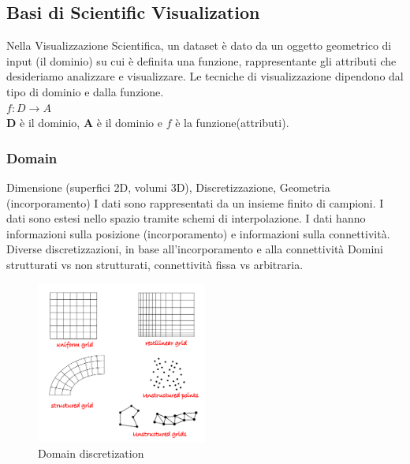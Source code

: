 \subsection{Basi di Scientific Visualization}
Nella Visualizzazione Scientifica, un dataset è dato da un oggetto geometrico di input (il dominio) su cui è definita una funzione, rappresentante gli attributi che desideriamo analizzare e visualizzare.
Le tecniche di visualizzazione dipendono dal tipo di dominio e dalla funzione. \\
$f : D \rightarrow A$ \\
\textbf{D} è il dominio, \textbf{A} è il dominio e $f$  è la funzione(attributi).
\subsubsection{Domain}
Dimensione (superfici 2D, volumi 3D), Discretizzazione, Geometria (incorporamento)
I dati sono rappresentati da un insieme finito di campioni. I dati sono estesi nello spazio tramite schemi di interpolazione. I dati hanno informazioni sulla posizione (incorporamento) e informazioni sulla connettività. 
Diverse discretizzazioni, in base all'incorporamento e alla connettività
Domini strutturati vs non strutturati, connettività fissa vs arbitraria.
\begin{figure}[H]
    \centering
    \includegraphics[width=0.5\textwidth]{images/DomDisk.png} 
    \caption{Domain discretization}
    \label{fig:immagine}
\end{figure}
